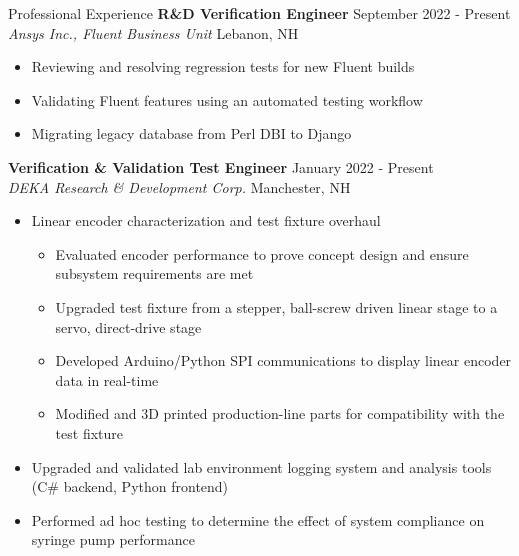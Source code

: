 \documentclass{resume}
\begin{document}
\begin{rSection}{Professional Experience}
    {\bf R\&D Verification Engineer} \hfill {September 2022 - Present}
    \\{\em Ansys Inc., Fluent Business Unit} \hfill {Lebanon, NH}
    \vspace{-0.5em}
    \begin{itemize}[label={\tiny\raisebox{1ex}{\textbullet}}, noitemsep]
        \item Reviewing and resolving regression tests for new Fluent builds
        \item Validating Fluent features using an automated testing workflow
        \item Migrating legacy database from Perl DBI to Django
    \end{itemize}
    \vspace{-0.4em}
    {\bf Verification \& Validation Test Engineer} \hfill {January 2022 - Present}
    \\{\em DEKA Research \& Development Corp.} \hfill {Manchester, NH}
    \vspace{-0.5em}
    \begin{itemize}[label={\tiny\raisebox{1ex}{\textbullet}}, noitemsep]
        \item Linear encoder characterization and test fixture overhaul
              \begin{itemize}[label={\tiny\raisebox{1ex}{\textbullet}}, noitemsep]
                  \item Evaluated encoder performance to prove concept design and ensure subsystem requirements are met
                  \item Upgraded test fixture from a stepper, ball-screw driven linear stage to a servo, direct-drive stage
                  \item Developed Arduino/Python SPI communications to display linear encoder data in real-time
                  \item Modified and 3D printed production-line parts for compatibility with the test fixture
              \end{itemize}
        \item Upgraded and validated lab environment logging system and analysis tools (C\# backend, Python frontend)
        \item Performed ad hoc testing to determine the effect of system compliance on syringe pump performance
    \end{itemize}
    \vspace{-0.4em}

\end{rSection}
\end{document}

